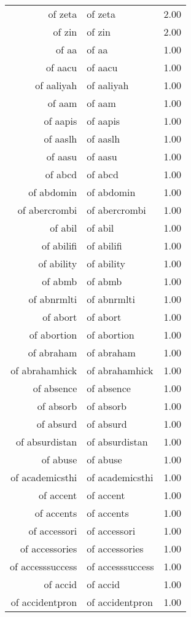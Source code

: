 \begin{table}[ht]
\begin{tabular}{rlr}
  of zeta & of zeta & 2.00 \\ 
  of zin & of zin & 2.00 \\ 
  of aa & of aa & 1.00 \\ 
  of aacu & of aacu & 1.00 \\ 
  of aaliyah & of aaliyah & 1.00 \\ 
  of aam & of aam & 1.00 \\ 
  of aapis & of aapis & 1.00 \\ 
  of aaslh & of aaslh & 1.00 \\ 
  of aasu & of aasu & 1.00 \\ 
  of abcd & of abcd & 1.00 \\ 
  of abdomin & of abdomin & 1.00 \\ 
  of abercrombi & of abercrombi & 1.00 \\ 
  of abil & of abil & 1.00 \\ 
  of abilifi & of abilifi & 1.00 \\ 
  of ability & of ability & 1.00 \\ 
  of abmb & of abmb & 1.00 \\ 
  of abnrmlti & of abnrmlti & 1.00 \\ 
  of abort & of abort & 1.00 \\ 
  of abortion & of abortion & 1.00 \\ 
  of abraham & of abraham & 1.00 \\ 
  of abrahamhick & of abrahamhick & 1.00 \\ 
  of absence & of absence & 1.00 \\ 
  of absorb & of absorb & 1.00 \\ 
  of absurd & of absurd & 1.00 \\ 
  of absurdistan & of absurdistan & 1.00 \\ 
  of abuse & of abuse & 1.00 \\ 
  of academicsthi & of academicsthi & 1.00 \\ 
  of accent & of accent & 1.00 \\ 
  of accents & of accents & 1.00 \\ 
  of accessori & of accessori & 1.00 \\ 
  of accessories & of accessories & 1.00 \\ 
  of accesssuccess & of accesssuccess & 1.00 \\ 
  of accid & of accid & 1.00 \\ 
  of accidentpron & of accidentpron & 1.00 \\ 

\end{tabular}
\end{table}
